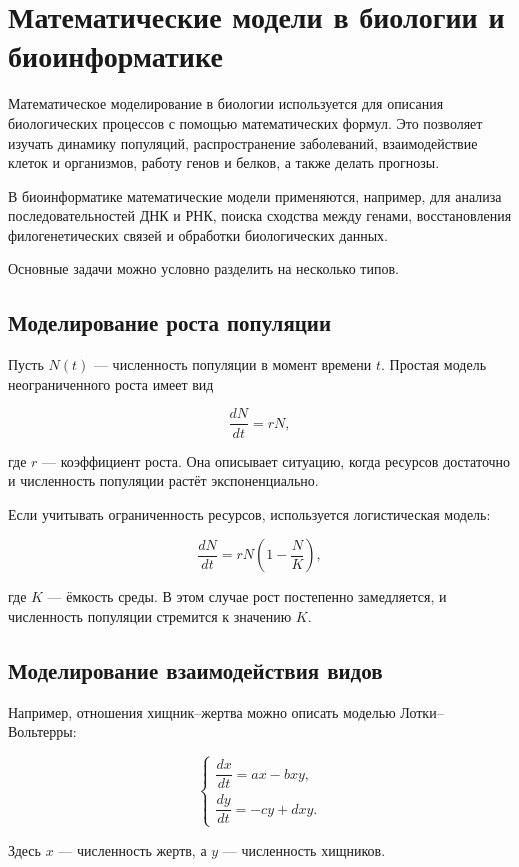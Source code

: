 \section{Математические модели в биологии и биоинформатике}
\label{sec:models-in-biology-and-bioinformatics}

Математическое моделирование в биологии используется для описания биологических процессов с помощью математических формул. Это позволяет изучать динамику популяций, распространение заболеваний, взаимодействие клеток и организмов, работу генов и белков, а также делать прогнозы.

В биоинформатике математические модели применяются, например, для анализа последовательностей ДНК и РНК, поиска сходства между генами, восстановления филогенетических связей и обработки биологических данных.

Основные задачи можно условно разделить на несколько типов.

\subsection{Моделирование роста популяции}

Пусть $N(t)$ --- численность популяции в момент времени $t$. Простая модель неограниченного роста имеет вид

\[
\frac{dN}{dt}=rN,
\]

где $r$ --- коэффициент роста. Она описывает ситуацию, когда ресурсов достаточно и численность популяции растёт экспоненциально.

Если учитывать ограниченность ресурсов, используется логистическая модель:

\[
\frac{dN}{dt}
=
rN\left(1-\frac{N}{K}\right),
\]

где $K$ --- ёмкость среды. В этом случае рост постепенно замедляется, и численность популяции стремится к значению $K$.

\subsection{Моделирование взаимодействия видов}

Например, отношения хищник--жертва можно описать моделью Лотки--Вольтерры:

\[
\begin{cases}
	\dfrac{dx}{dt}=ax-bxy,\\[6pt]
	\dfrac{dy}{dt}=-cy+dxy.
\end{cases}
\]

Здесь $x$ --- численность жертв, а $y$ --- численность хищников.

